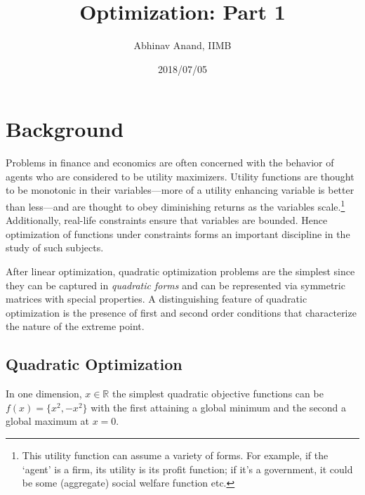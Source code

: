 \documentclass[11pt,]{article}
\title{Optimization: Part 1}
\author{Abhinav Anand, IIMB}
\date{2018/07/05}
\let\rmarkdownfootnote\footnote%
\def\footnote{\protect\rmarkdownfootnote}
\begin{document}
\maketitle

\section{Background}\label{background}

Problems in finance and economics are often concerned with the behavior
of agents who are considered to be utility maximizers. Utility functions
are thought to be monotonic in their variables---more of a utility
enhancing variable is better than less---and are thought to obey
diminishing returns as the variables scale.\footnote{This utility
  function can assume a variety of forms. For example, if the `agent' is
  a firm, its utility is its profit function; if it's a government, it
  could be some (aggregate) social welfare function etc.} Additionally,
real-life constraints ensure that variables are bounded. Hence
optimization of functions under constraints forms an important
discipline in the study of such subjects.

After linear optimization, quadratic optimization problems are the
simplest since they can be captured in \emph{quadratic forms} and can be
represented via symmetric matrices with special properties. A
distinguishing feature of quadratic optimization is the presence of
first and second order conditions that characterize the nature of the
extreme point.

\subsection{Quadratic Optimization}\label{quadratic-optimization}

In one dimension, \(x\in \mathbb{R}\) the simplest quadratic objective
functions can be \(f(x)=\{x^2, -x^2\}\) with the first attaining a
global minimum and the second a global maximum at \(x=0\).
\end{document}

